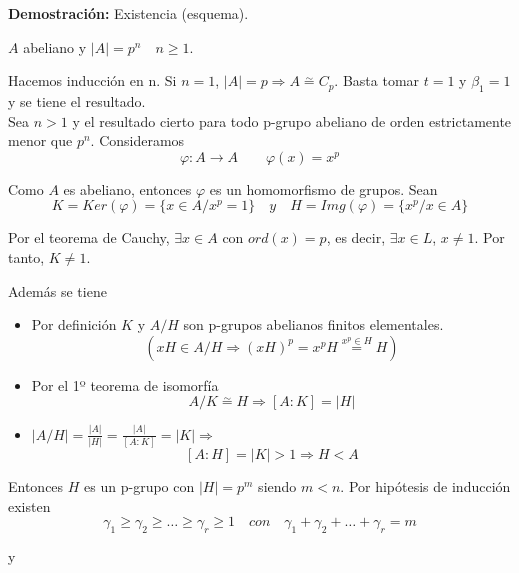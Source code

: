 \documentclass{article}
\begin{document}
\textbf{Demostración:} Existencia (esquema).

$A$ abeliano y $|A|=p^n\quad n\geq 1$.

Hacemos inducción en n. Si $n=1$, $|A|=p \Rightarrow A\overset{\sim}{=} C_p$. Basta tomar $t=1$ y $\beta_1=1$ y se tiene el resultado. \\

Sea $n>1$ y el resultado cierto para todo p-grupo abeliano de orden estrictamente menor que $p^n$. Consideramos
\begin{equation*}
\varphi:A\longrightarrow A\qquad \varphi(x)=x^p
\end{equation*}

Como $A$ es abeliano, entonces $\varphi$ es un homomorfismo de grupos. Sean
\begin{equation*}
K=Ker(\varphi)=\{x\in A/x^p=1\}\quad y\quad H=Img(\varphi)=\{x^p/x\in A\}
\end{equation*}

Por el teorema de Cauchy, $\exists x\in A$ con $ord(x)=p$, es decir, $\exists x\in L$, $x\neq 1$. Por tanto, $K\neq 1$.

Además se tiene
\begin{itemize}
\item Por definición $K$ y $A/H$ son p-grupos abelianos finitos elementales.
\begin{equation*}
(xH\in A/H\Rightarrow (xH)^p=x^pH\overset{x^p\in H}{=} H)
\end{equation*}

\item Por el 1º teorema de isomorfía
\begin{equation*}
A/K\overset{\sim}{=} H\Rightarrow \left[A:K\right]=|H|
\end{equation*}

\item $|A/H|=\frac{|A|}{|H|}=\frac{|A|}{\left[A:K\right]}=|K|\Rightarrow$
\begin{equation*}
\left[A:H\right]=|K|>1\Rightarrow H< A
\end{equation*}
\end{itemize}

Entonces $H$ es un p-grupo con $|H|=p^m$ siendo $m<n$. Por hipótesis de inducción existen
\begin{equation*}
\gamma_1\geq \gamma_2\geq \ldots\geq \gamma_r\geq 1\quad con\quad \gamma_1+\gamma_2+\ldots+\gamma_r=m
\end{equation*}

y
\end{document}
